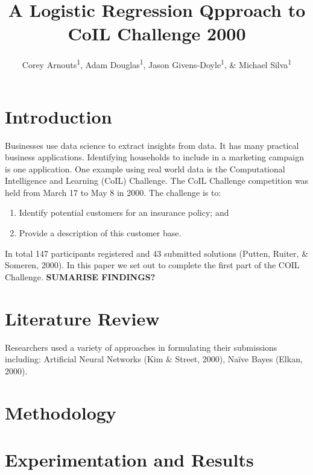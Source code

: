 \documentclass[man]{apa6}
\title{A Logistic Regression Qpproach to CoIL Challenge 2000}
\author{Corey Arnouts\textsuperscript{1}, Adam Douglas\textsuperscript{1}, Jason Givens-Doyle\textsuperscript{1}, \& Michael Silva\textsuperscript{1}}
\date{}
\affiliation{
\vspace{0.5cm}
\textsuperscript{1} MS in Data Science Students CUNY School of Professional Studies}
\begin{document}
\maketitle

\hypertarget{introduction}{%
\section{Introduction}\label{introduction}}

Businesses use data science to extract insights from data. It has many practical business applications. Identifying households to include in a marketing campaign is one application. One example using real world data is the Computational Intelligence and Learning (CoIL) Challenge. The CoIL Challenge competition was held from March 17 to May 8 in 2000. The challenge is to:

\begin{enumerate}
\def\labelenumi{\arabic{enumi}.}
\item
  Identify potential customers for an insurance policy; and
\item
  Provide a description of this customer base.
\end{enumerate}

In total 147 participants registered and 43 submitted solutions (Putten, Ruiter, \& Someren, 2000). In this paper we set out to complete the first part of the COIL Challenge. \textbf{SUMARISE FINDINGS?}

\hypertarget{literature-review}{%
\section{Literature Review}\label{literature-review}}

Researchers used a variety of approaches in formulating their submissions including: Artificial Neural Networks (Kim \& Street, 2000), Naïve Bayes (Elkan, 2000).

\hypertarget{methodology}{%
\section{Methodology}\label{methodology}}

\hypertarget{experimentation-and-results}{%
\section{Experimentation and Results}\label{experimentation-and-results}}
\end{document}

